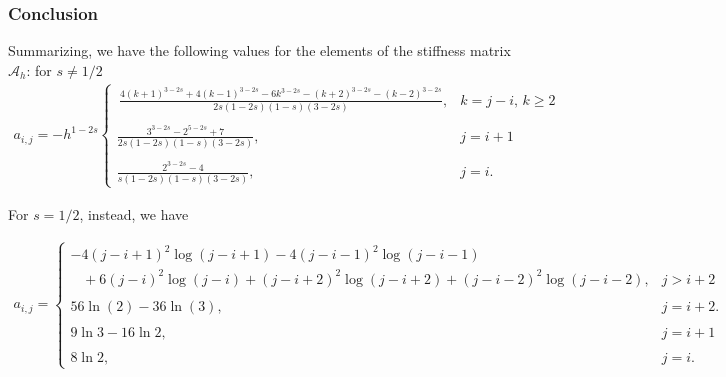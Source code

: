 \subsubsection*{Conclusion}
Summarizing, we have the following values for the elements of the stiffness matrix $\mathcal{A}_h$: for $s\neq 1/2$
\begin{align*}
	a_{i,j} =  -h^{1-2s} \begin{cases}
			\displaystyle \,\frac{4(k+1)^{3-2s} + 4(k-1)^{3-2s}-6k^{3-2s}-(k+2)^{3-2s}-(k-2)^{3-2s}}{2s(1-2s)(1-s)(3-2s)}, &  \displaystyle k=j-i,\,k\geq 2
			\\
			\\
			\displaystyle\frac{3^{3-2s}-2^{5-2s}+7}{2s(1-2s)(1-s)(3-2s)}, & \displaystyle j=i+1
			\\
			\\
			\displaystyle\frac{2^{3-2s}-4}{s(1-2s)(1-s)(3-2s)}, & \displaystyle j=i.
		\end{cases}	
\end{align*}

For $s=1/2$, instead, we have

\begin{align*}
	a_{i,j} = \begin{cases}
			-4(j-i+1)^2\log(j-i+1)-4(j-i-1)^2\log(j-i-1) 
			\\
			\;\;\;+6(j-i)^2\log(j-i)+(j-i+2)^2\log(j-i+2)+(j-i-2)^2\log(j-i-2), &  \displaystyle j> i+2
			\\
			\\
			56\ln(2)-36\ln(3), & \displaystyle j= i+2.
			\\
			\\
			\displaystyle 9\ln 3-16\ln 2, & \displaystyle j=i+1
			\\
			\\
			\displaystyle 8\ln 2, & \displaystyle j=i.
		\end{cases}	
\end{align*}





